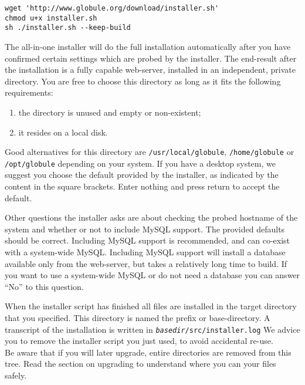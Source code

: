 \documentclass[10pt,a4paper]{article}
\makeatletter
\newenvironment{p}{\@open{P}{}}{\@close{P}}
\newenvironment{p}{}{\par}
\makeatother
\begin{document}
\begin{Verbatim}
wget 'http://www.globule.org/download/installer.sh'
chmod u+x installer.sh
sh ./installer.sh --keep-build
\end{Verbatim}

\begin{p}
The all-in-one installer will do the full installation automatically after you
have confirmed certain settings which are probed by the installer.  The
end-result after the installation is a fully capable web-server, installed in
an independent, private directory.  You are free to choose this directory as
long as it fits the following requirements:
\begin{enumerate}
\item the directory is unused and empty or non-existent;
\item it resides on a local disk.
\end{enumerate}
\end{p}

\begin{p}
Good alternatives for this directory are \verb!/usr/local/globule!,
\verb!/home/globule! or \verb!/opt/globule! depending on your system.  If you
have a desktop system, we suggest you choose the default provided by the
installer, as indicated by the content in the square brackets.  Enter nothing
and press return to accept the default.
\end{p}

\begin{p}
Other questions the installer asks are about checking the probed hostname of
the system and whether or not to include MySQL support.  The provided defaults
should be correct.  Including MySQL support is recommended, and can co-exist
with a system-wide MySQL.  Including MySQL support will install a database
available only from the web-server, but takes a relatively long time to build.
If you want to use a system-wide MySQL or do not need a database you can
answer ``No'' to this question.
\end{p}

\begin{p}
When the installer script has finished all files are installed in the target
directory that you specified.  This directory is named the prefix or
base-directory.  A transcript of the installation is written in
\texttt{\textit{basedir}/src/installer.log} We advice you to remove the
installer script you just used, to avoid accidental re-use. \\
Be aware that if you will later upgrade, entire directories are removed from
this tree.  Read the section on upgrading to understand where you can your
files safely.
\end{p}
\end{document}
